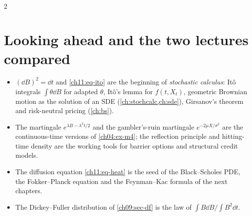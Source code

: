 \begin{paracol}{2}
\section{Looking ahead and the two lectures compared}\label{ch11:sec-ahead}
\begin{itemize}
  \item $(\dd B)^2=\dd t$ and \eqref{ch11:eq-ito} are the beginning of \emph{stochastic calculus}: It\^o integrals $\int\theta\dd B$ for adapted $\theta$, It\^o's lemma for
        $f(t,X_t)$, geometric Brownian motion as the solution of an SDE (\cref{ch:stochcalc,ch:sde}), Girsanov's theorem and risk-neutral pricing (\cref{ch:bs}).
  \item The martingale $e^{\lambda B-\lambda^2t/2}$ and the gambler's-ruin martingale $e^{-2\mu X/\sigma^2}$ are the continuous-time versions
        of \cref{ch04:ex-m4}; the reflection principle and hitting-time density are the working tools for barrier options and
        structural credit models.
  \item The diffusion equation \eqref{ch11:eq-heat} is the seed of the Black--Scholes PDE, the Fokker--Planck equation and the Feynman--Kac formula of the next chapters.
  \item The Dickey--Fuller distribution of \cref{ch09:sec-df} is the law of $\int B\dd B/\int B^2\dd t$.
\end{itemize}


\end{paracol}

